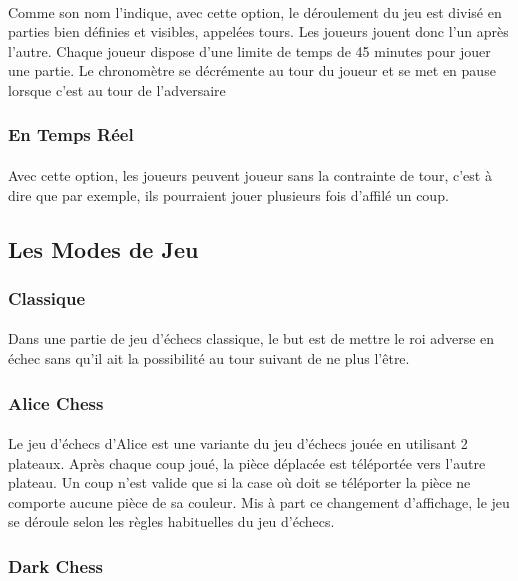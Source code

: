 \documentclass[10pt, a4paper]{article}
\begin{document}
					\paragraph{}Comme son nom l'indique, avec cette option, le déroulement du jeu est divisé en parties bien définies et visibles, appelées tours. Les joueurs jouent donc l'un après l'autre. Chaque joueur dispose d'une limite de temps de 45 minutes pour jouer une partie. Le chronomètre se décrémente au tour du joueur et se met en pause lorsque c'est au tour de l'adversaire		
				\subsubsection{En Temps Réel}
					\paragraph{}Avec cette option, les joueurs peuvent joueur sans la contrainte de tour, c'est à dire que par exemple, ils pourraient jouer plusieurs fois d'affilé un coup. 
			\subsection{Les Modes de Jeu}				
				\subsubsection{Classique}
					\paragraph{}Dans une partie de jeu d'échecs classique, le but est de mettre le roi adverse en échec sans qu'il ait la possibilité au tour suivant de ne plus l'être.
				\subsubsection{Alice Chess}
					\paragraph{}Le jeu d'échecs d'Alice est une variante du jeu d'échecs jouée en utilisant 2 plateaux. Après chaque coup joué, la pièce déplacée est téléportée vers l'autre plateau. Un coup n'est valide que si la case où doit se téléporter la pièce ne comporte aucune pièce de sa couleur. Mis à part ce changement d'affichage, le jeu se déroule selon les règles habituelles du jeu d'échecs.
				\subsubsection{Dark Chess}
\end{document}
